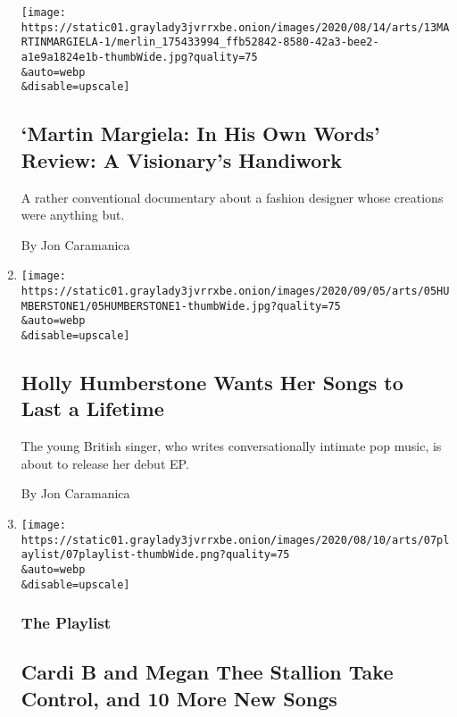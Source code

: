 \begin{enumerate}
  \texttt{[image: https://static01.graylady3jvrrxbe.onion/images/2020/08/14/arts/13MARTINMARGIELA-1/merlin\_175433994\_ffb52842-8580-42a3-bee2-a1e9a1824e1b-thumbWide.jpg?quality=75\\\&auto=webp\\\&disable=upscale]}

  \hypertarget{martin-margiela-in-his-own-words-review-a-visionarys-handiwork}{%
  \subsection{`Martin Margiela: In His Own Words' Review: A Visionary's
  Handiwork}\label{martin-margiela-in-his-own-words-review-a-visionarys-handiwork}}

  A rather conventional documentary about a fashion designer whose
  creations were anything but.

  By Jon Caramanica
\item
  \href{/2020/08/10/arts/music/holly-humberstone-falling-asleep-at-the-wheel.html}{}

  \texttt{[image: https://static01.graylady3jvrrxbe.onion/images/2020/09/05/arts/05HUMBERSTONE1/05HUMBERSTONE1-thumbWide.jpg?quality=75\\\&auto=webp\\\&disable=upscale]}

  \hypertarget{holly-humberstone-wants-her-songs-to-last-a-lifetime}{%
  \subsection{Holly Humberstone Wants Her Songs to Last a
  Lifetime}\label{holly-humberstone-wants-her-songs-to-last-a-lifetime}}

  The young British singer, who writes conversationally intimate pop
  music, is about to release her debut EP.

  By Jon Caramanica
\item
  \href{/2020/08/07/arts/music/playlist-cardi-b-megan-thee-stallion.html}{}

  \texttt{[image: https://static01.graylady3jvrrxbe.onion/images/2020/08/10/arts/07playlist/07playlist-thumbWide.png?quality=75\\\&auto=webp\\\&disable=upscale]}

  \hypertarget{the-playlist-1}{%
  \subsubsection{The Playlist}\label{the-playlist-1}}

  \hypertarget{cardi-b-and-megan-thee-stallion-take-control-and-10-more-new-songs}{%
  \subsection{Cardi B and Megan Thee Stallion Take Control, and 10 More
  New
  Songs}\label{cardi-b-and-megan-thee-stallion-take-control-and-10-more-new-songs}}


\end{enumerate}
